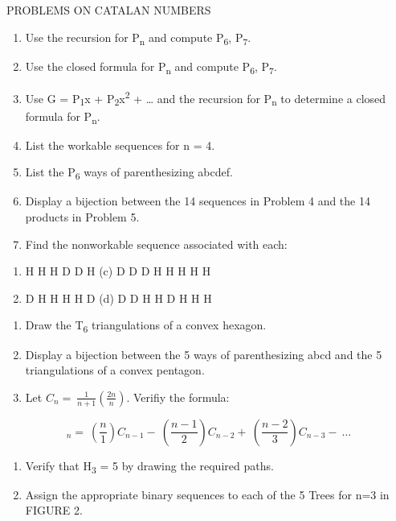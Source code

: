 
PROBLEMS ON CATALAN NUMBERS
\begin{enumerate}
\def\labelenumi{\arabic{enumi}.}

\item
  Use the recursion for P\textsubscript{n} and compute
  P\textsubscript{6}, P\textsubscript{7}.
\item
  Use the closed formula for P\textsubscript{n} and compute
  P\textsubscript{6}, P\textsubscript{7}.
\item
  Use G = P\textsubscript{1}x + P\textsubscript{2}x\textsuperscript{2} +
  \ldots{} and the recursion for P\textsubscript{n} to determine a
  closed formula for P\textsubscript{n}.
\item
  List the workable sequences for n = 4.
\item
  List the P\textsubscript{6} ways of parenthesizing abcdef.
\item
  Display a bijection between the 14 sequences in Problem 4 and the 14
  products in Problem 5.
\item
  Find the nonworkable sequence associated with each:

\end{enumerate}
\begin{enumerate}
\def\labelenumi{(\alph{enumi})}

\item
  H H H D D H (c) D D D H H H H H
\item
  D H H H H D (d) D D H H D H H H

\end{enumerate}
\begin{enumerate}
\def\labelenumi{\arabic{enumi}.}

\item
  Draw the T\textsubscript{6} triangulations of a convex hexagon.
\item
  Display a bijection between the 5 ways of parenthesizing abcd and the
  5 triangulations of a convex pentagon.
\item
  Let \(C_{n} = \ \frac{1}{n + 1}\left( \frac{2n}{n} \right).\) Verifiy
  the formula:

\end{enumerate}

\[
_{n} = \ \left( \frac{n}{1} \right)C_{n - 1} - \ \left( \frac{n - 1}{2} \right)C_{n - 2} + \ \left( \frac{n - 2}{3} \right)C_{n - 3} - \ \ldots
\]
\begin{enumerate}
\def\labelenumi{\arabic{enumi}.}

\item
  Verify that H\textsubscript{3} = 5 by drawing the required paths.
\item
  Assign the appropriate binary sequences to each of the 5 Trees for n=3
  in FIGURE 2.

\end{enumerate}

